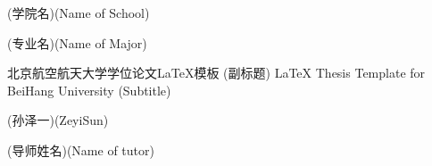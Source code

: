 
\school
{(学院名)}{(Name of School)}

\major
{(专业名)}{(Name of Major)}

\thesistitle
{北京航空航天大学学位论文\LaTeX{}模板}
{(副标题)}
{\LaTeX{} Thesis Template for BeiHang University}
{(Subtitle)}

\thesisauthor
{(孙泽一)}{(ZeyiSun)}

\teacher
{(导师姓名)}{(Name of tutor)}






